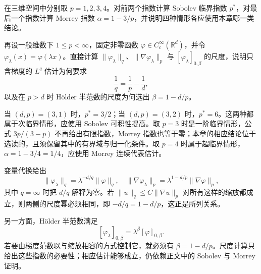 \begin{exercise}\label{b1:ex:24-regime-and-scaling}
在三维空间中分别取 \(p=1,2,3,4\)。对前两个指数计算 Sobolev 临界指数 \(p^*\)，对最后一个指数计算 Morrey 指数 \(\alpha=1-3/p\)，并说明四种情形各应使用本章哪一类结论。

\ProseParagraphBreak

再设一般维数下 \(1\le p<\infty\)，固定非零函数 \(\varphi\in C_c^\infty(\mathbb R^d)\)，并令 \(\varphi_\lambda(x)=\varphi(\lambda x)\)。直接计算 \(\|\varphi_\lambda\|_q\)、\(\|\nabla\varphi_\lambda\|_p\) 与 \([\varphi_\lambda]_{0,\beta}\) 的尺度，说明只含梯度的 \(L^q\) 估计为何要求
\[
 \frac1q=\frac1p-\frac1d,
\]
以及在 \(p>d\) 时 Hölder 半范数的尺度为何选出 \(\beta=1-d/p\)。
\end{exercise}
\begin{solution}
当 \((d,p)=(3,1)\) 时，\(p^*=3/2\)；当 \((d,p)=(3,2)\) 时，\(p^*=6\)。这两种都属于次临界情形，应使用 Sobolev 可积性提高。取 \(p=3\) 时是一阶临界情形，公式 \(3p/(3-p)\) 不再给出有限指数，Morrey 指数也等于零；本章的相应结论位于选读的，且须保留其中的有界域与归一化条件。取 \(p=4\) 时属于超临界情形，\(\alpha=1-3/4=1/4\)，应使用 Morrey 连续代表估计。

变量代换给出
\[
 \|\varphi_\lambda\|_q
   =\lambda^{-d/q}\|\varphi\|_q,
 \quad
 \|\nabla\varphi_\lambda\|_p
   =\lambda^{1-d/p}\|\nabla\varphi\|_p,
\]
其中 \(q=\infty\) 时把 \(d/q\) 解释为零。若
\(\|u\|_q\le C\|\nabla u\|_p\) 对所有这样的缩放都成立，则两侧的尺度幂必须相同，即
\(-d/q=1-d/p\)，这正是所列关系。

另一方面，Hölder 半范数满足
\[
 [\varphi_\lambda]_{0,\beta}
 =\lambda^\beta[\varphi]_{0,\beta}.
\]
若要由梯度范数以与缩放相容的方式控制它，就必须有
\(\beta=1-d/p\)。尺度计算只给出这些指数的必要性；相应估计能够成立，仍依赖正文中的 Sobolev 与 Morrey 证明。
\end{solution}

